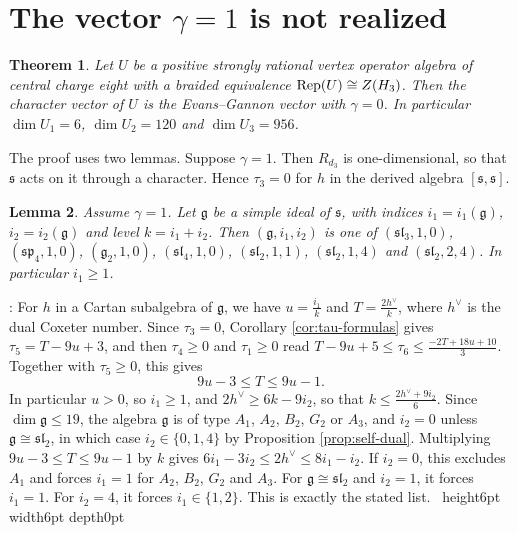\documentclass[leqno]{article}
\let\cal\relax
\newcommand{\cal}{\mathcal}
\renewcommand{\leq}{\ensuremath{\leqslant}}
\renewcommand{\geq}{\ensuremath{\geqslant}}
\newcommand{\qed}{\hfill \vrule height6pt  width6pt depth0pt}
\DeclareMathOperator{\Rep}{Rep}
\newtheorem{thm}{Theorem}[section]
\newtheorem{lemma}[thm]{Lemma}
\newenvironment{proof}[1][]{\noindent {\it Proof #1} : }{\hbox{~}\qed
\smallskip
}
\numberwithin{equation}{section}
\begin{document}
\section{The vector \texorpdfstring{$\gamma = 1$}{gamma = 1} is not realized}
\label{sec:gamma-one}

\begin{thm}
\label{thm:gamma-one}
Let $U$ be a positive strongly rational vertex operator algebra of central charge eight with a braided equivalence $\Rep(U) \cong Z(\cal H_3)$. Then the character vector of $U$ is the Evans--Gannon vector with $\gamma = 0$. In particular $\dim U_1 = 6$, $\dim U_2 = 120$ and $\dim U_3 = 956$.
\end{thm}

The proof uses two lemmas. Suppose $\gamma = 1$. Then $R_{d_3}$ is one-dimensional, so that $\mathfrak s$ acts on it through a character. Hence $\tau_3 = 0$ for $h$ in the derived algebra $[\mathfrak s,\mathfrak s]$.

\begin{lemma}
\label{lem:simple-ideals}
Assume $\gamma = 1$. Let $\mathfrak g$ be a simple ideal of $\mathfrak s$, with indices $i_1 = i_1(\mathfrak g)$, $i_2 = i_2(\mathfrak g)$ and level $k = i_1+i_2$. Then $(\mathfrak g,i_1,i_2)$ is one of $(\mathfrak{sl}_3,1,0)$, $(\mathfrak{sp}_4,1,0)$, $(\mathfrak g_2,1,0)$, $(\mathfrak{sl}_4,1,0)$, $(\mathfrak{sl}_2,1,1)$, $(\mathfrak{sl}_2,1,4)$ and $(\mathfrak{sl}_2,2,4)$. In particular $i_1 \geq 1$.
\end{lemma}

\begin{proof}
For $h$ in a Cartan subalgebra of $\mathfrak g$, we have $u = \frac{i_1}{k}$ and $T = \frac{2h^\vee}{k}$, where $h^\vee$ is the dual Coxeter number. Since $\tau_3 = 0$, Corollary \ref{cor:tau-formulas} gives $\tau_5 = T-9u+3$, and then $\tau_4 \geq 0$ and $\tau_1 \geq 0$ read $T-9u+5 \leq \tau_6 \leq \frac{-2T+18u+10}{3}$. Together with $\tau_5 \geq 0$, this gives
\[
9u-3 \leq T \leq 9u-1.
\]
In particular $u > 0$, so $i_1 \geq 1$, and $2h^\vee \geq 6k-9i_2$, so that $k \leq \frac{2h^\vee+9i_2}{6}$. Since $\dim \mathfrak g \leq 19$, the algebra $\mathfrak g$ is of type $A_1$, $A_2$, $B_2$, $G_2$ or $A_3$, and $i_2 = 0$ unless $\mathfrak g \cong \mathfrak{sl}_2$, in which case $i_2 \in \{0,1,4\}$ by Proposition \ref{prop:self-dual}. Multiplying $9u-3 \leq T \leq 9u-1$ by $k$ gives $6i_1-3i_2 \leq 2h^\vee \leq 8i_1-i_2$. If $i_2 = 0$, this excludes $A_1$ and forces $i_1 = 1$ for $A_2$, $B_2$, $G_2$ and $A_3$. For $\mathfrak g \cong \mathfrak{sl}_2$ and $i_2 = 1$, it forces $i_1 = 1$. For $i_2 = 4$, it forces $i_1 \in \{1,2\}$. This is exactly the stated list.
\end{proof}
\end{document}
